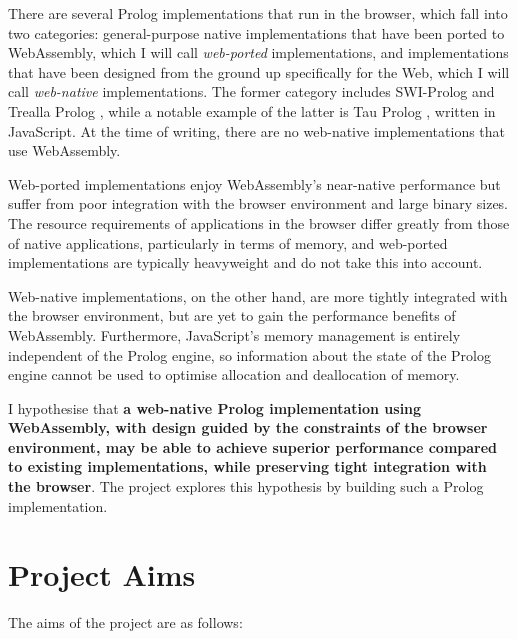 There are several Prolog implementations that run in the browser, which fall into two categories: general-purpose native implementations that have been ported to WebAssembly, which I will call \emph{web-ported} implementations, and implementations that have been designed from the ground up specifically for the Web, which I will call \emph{web-native} implementations. The former category includes SWI-Prolog \cite{wielemakerSWIProlog2012} and Trealla Prolog \cite{davisonTreallaProlog2020}, while a notable example of the latter is Tau Prolog \cite{riazaTauPrologProlog2024}, written in JavaScript. At the time of writing, there are no web-native implementations that use WebAssembly.

Web-ported implementations enjoy WebAssembly's near-native performance but suffer from poor integration with the browser environment and large binary sizes. The resource requirements of applications in the browser differ greatly from those of native applications, particularly in terms of memory, and web-ported implementations are typically heavyweight and do not take this into account.

Web-native implementations, on the other hand, are more tightly integrated with the browser environment, but are yet to gain the performance benefits of WebAssembly. Furthermore, JavaScript's memory management is entirely independent of the Prolog engine, so information about the state of the Prolog engine cannot be used to optimise allocation and deallocation of memory.

I hypothesise that \textbf{a web-native Prolog implementation using WebAssembly, with design guided by the constraints of the browser environment, may be able to achieve superior performance compared to existing implementations, while preserving tight integration with the browser}. The project explores this hypothesis by building such a Prolog implementation.

\section{Project Aims}

The aims of the project are as follows:

